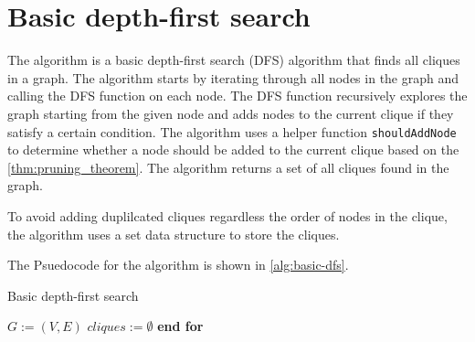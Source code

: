 \section{Basic depth-first search}
The algorithm is a basic depth-first search (DFS) algorithm that finds all cliques in a graph. The algorithm starts by iterating through all nodes in the graph and calling the DFS function on each node. The DFS function recursively explores the graph starting from the given node and adds nodes to the current clique if they satisfy a certain condition. The algorithm uses a helper function \texttt{shouldAddNode} to determine whether a node should be added to the current clique based on the \autoref{thm:pruning_theorem}. The algorithm returns a set of all cliques found in the graph.

To avoid adding duplilcated cliques regardless the order of nodes in the clique, the algorithm uses a set data structure to store the cliques.

The Psuedocode for the algorithm is shown in \autoref{alg:basic-dfs}.


\begin{algorithm}
    \caption{Basic depth-first search}
    \label{alg:basic-dfs}



    $G := (V,E)$ 
    $cliques := \emptyset$ 
    \textbf{end for}

\end{algorithm}